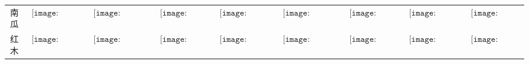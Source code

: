 \begin{longtable}{|c|cccccccc|}
南瓜&$\begin{array}{c}\texttt{[image: figures/Pumpkin\_Candle.png]}\end{array}$&$\begin{array}{c}\texttt{[image: figures/Pumpkin\_Candelabra.png]}\end{array}$&$\begin{array}{c}\texttt{[image: figures/Pumpkin\_Lamp.png]}\end{array}$&$\begin{array}{c}\texttt{[image: figures/Pumpkin\_Lantern.png]}\end{array}$&$\begin{array}{c}\texttt{[image: figures/Pumpkin\_Chandelier.png]}\end{array}$&$\begin{array}{c}\texttt{[image: figures/Pumpkin\_Door.png]}\end{array}$&$\begin{array}{c}\texttt{[image: figures/Pumpkin\_Toilet.png]}\end{array}$&$\begin{array}{c}\texttt{[image: figures/Pumpkin\_Chest.png]}\end{array}$\\
红木&$\begin{array}{c}\texttt{[image: figures/Rich\_Mahogany\_Candle.png]}\end{array}$&$\begin{array}{c}\texttt{[image: figures/Rich\_Mahogany\_Candelabra.png]}\end{array}$&$\begin{array}{c}\texttt{[image: figures/Rich\_Mahogany\_Lamp.png]}\end{array}$&$\begin{array}{c}\texttt{[image: figures/Rich\_Mahogany\_Lantern.png]}\end{array}$&$\begin{array}{c}\texttt{[image: figures/Rich\_Mahogany\_Chandelier.png]}\end{array}$&$\begin{array}{c}\texttt{[image: figures/Rich\_Mahogany\_Door.png]}\end{array}$&$\begin{array}{c}\texttt{[image: figures/Rich\_Mahogany\_Toilet.png]}\end{array}$&$\begin{array}{c}\texttt{[image: figures/Rich\_Mahogany\_Chest.png]}\end{array}$\\

\end{longtable}
